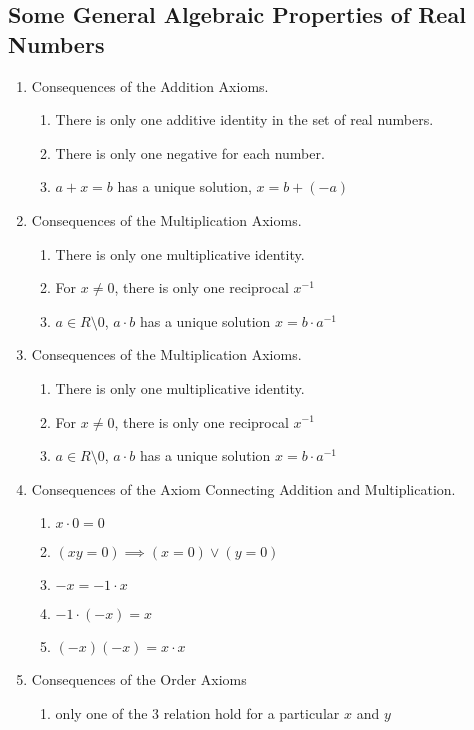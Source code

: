 \documentclass[letter]{article}
\begin{document}
\subsection{Some General Algebraic Properties of Real Numbers}
\begin{enumerate}
\item Consequences of the Addition Axioms.
	\begin{enumerate}
		\item There is only one additive identity in the set of real numbers.
		\item There is only one negative for each number.
		\item $a+x=b$ has a unique solution, $x = b+(-a)$
	\end{enumerate}
\item Consequences of the Multiplication Axioms.
	\begin{enumerate}
		\item There is only one multiplicative identity.
		\item For $x\neq 0$, there is only one reciprocal $x^{-1}$
		\item $a\in R \setminus 0$, $a\cdot b$ has a unique solution $x = b\cdot a^{-1}$
	\end{enumerate}
\item Consequences of the Multiplication Axioms.
	\begin{enumerate}
		\item There is only one multiplicative identity.
		\item For $x\neq 0$, there is only one reciprocal $x^{-1}$
		\item $a\in R \setminus 0$, $a\cdot b$ has a unique solution $x = b\cdot a^{-1}$
	\end{enumerate}
\item Consequences of the Axiom Connecting Addition and Multiplication.
	\begin{enumerate}
		\item $x\cdot 0 = 0$
		\item $(xy=0)\implies (x=0)\vee(y=0)$
		\item $-x = -1 \cdot x$
		\item $-1 \cdot (-x) = x$
		\item $(-x)(-x) = x\cdot x$
	\end{enumerate}
\item Consequences of the Order Axioms
	\begin{enumerate}
		\item only one of the 3 relation hold for a particular $x$ and $y$

\end{enumerate}
\end{enumerate}
\end{document}
